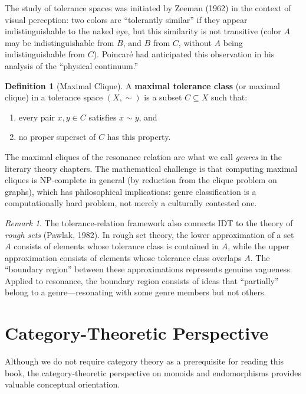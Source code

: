 \documentclass[11pt,openany]{book}
\theoremstyle{definition}
\newtheorem{definition}[axiom]{Definition}
\theoremstyle{plain}
\theoremstyle{remark}
\newtheorem{remark}[axiom]{Remark}
\begin{document}
The study of tolerance spaces was initiated by Zeeman (1962) in the context of visual perception: two colors are ``tolerantly similar'' if they appear indistinguishable to the naked eye, but this similarity is not transitive (color $A$ may be indistinguishable from $B$, and $B$ from $C$, without $A$ being indistinguishable from $C$). Poincar\'e had anticipated this observation in his analysis of the ``physical continuum.''

\begin{definition}[Maximal Clique]
A \textbf{maximal tolerance class} (or maximal clique) in a tolerance space $(X, \sim)$ is a subset $C \subseteq X$ such that:
\begin{enumerate}
\item every pair $x, y \in C$ satisfies $x \sim y$, and
\item no proper superset of $C$ has this property.
\end{enumerate}
\end{definition}

The maximal cliques of the resonance relation are what we call \emph{genres} in the literary theory chapters. The mathematical challenge is that computing maximal cliques is NP-complete in general (by reduction from the clique problem on graphs), which has philosophical implications: genre classification is a computationally hard problem, not merely a culturally contested one.

\begin{remark}
The tolerance-relation framework also connects IDT to the theory of \emph{rough sets} (Pawlak, 1982). In rough set theory, the lower approximation of a set $A$ consists of elements whose tolerance class is contained in $A$, while the upper approximation consists of elements whose tolerance class overlaps $A$. The ``boundary region'' between these approximations represents genuine vagueness. Applied to resonance, the boundary region consists of ideas that ``partially'' belong to a genre---resonating with some genre members but not others.
\end{remark}

\section{Category-Theoretic Perspective}

Although we do not require category theory as a prerequisite for reading this book, the category-theoretic perspective on monoids and endomorphisms provides valuable conceptual orientation.
\end{document}
